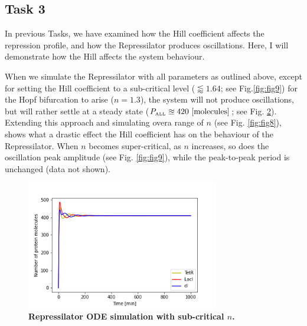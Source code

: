 \documentclass[runningheads,a4paper]{llncs}
\begin{document}
\begin{figure}
    \label{fig:fig6}
\end{figure}

\clearpage
\subsection*{Task 3}
In previous Tasks, we have examined how the Hill coefficient affects the repression profile, and how the Repressilator produces oscillations. Here, I will demonstrate how the Hill affects the system behaviour. 

When we simulate the Repressilator with all parameters as outlined above, except for setting the Hill coefficient to a sub-critical level ($\lessapprox 1.64$; see Fig.\ref{fig:fig9}) for the Hopf bifurcation to arise ($n = 1.3$), the system will not produce oscillations, but will rather settle at a steady state ($P_{\textrm{\tiny ALL}} \approxeq 420\ [\textrm{molecules}]$; see Fig. \ref{fig:fig7}). Extending this approach and simulating over\linebreak a range of $n$ (see Fig. \ref{fig:fig8}), shows what a drastic effect the Hill coefficient has on the behaviour of the Repressilator. When $n$ becomes super-critical, as $n$ increases, so does the oscillation peak amplitude (see Fig. \ref{fig:fig9}), while the peak-to-peak period is unchanged (data not shown).

\vspace{-3\abovedisplayskip}
\begin{figure}
    \singlespacing
    \centering
    \includegraphics[width=0.75\textwidth]{suplementary_information_and_code/Task3_figure1.png}
    \caption{\textbf{Repressilator ODE simulation with sub-critical $n$.}}
    \label{fig:fig7}
\end{figure}
\end{document}

